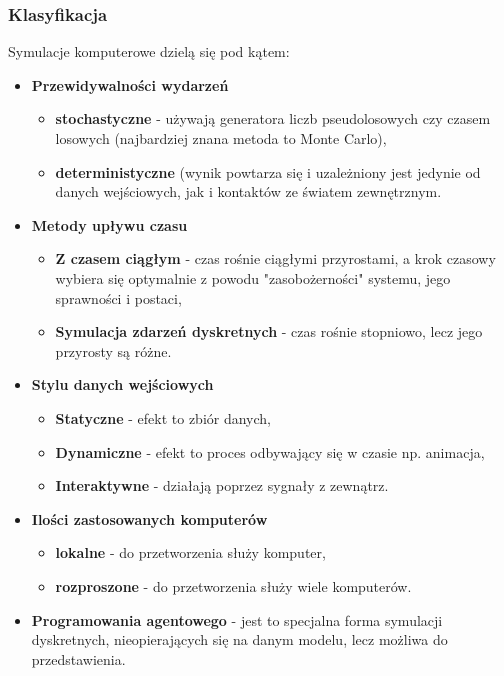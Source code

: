 \subsubsection{Klasyfikacja}

Symulacje komputerowe dzielą się pod kątem:

\begin{itemize}
	\item \textbf{Przewidywalności wydarzeń}
	\begin{itemize}
		\item \textbf{stochastyczne} - używają generatora liczb pseudolosowych czy czasem losowych (najbardziej znana metoda to Monte Carlo),
		\item \textbf{deterministyczne} (wynik powtarza się i uzależniony jest jedynie od danych wejściowych, jak i kontaktów ze światem zewnętrznym.
	\end{itemize}
	\item \textbf{Metody upływu czasu}
	\begin{itemize}
		\item \textbf{Z czasem ciągłym} - czas rośnie ciągłymi przyrostami, a krok czasowy wybiera się optymalnie z powodu "zasobożerności" systemu, jego sprawności i postaci,
		\item \textbf{Symulacja zdarzeń dyskretnych} - czas rośnie stopniowo, lecz jego przyrosty są różne.
	\end{itemize}
	\item \textbf{Stylu danych wejściowych}
	\begin{itemize}
		\item \textbf{Statyczne} - efekt to zbiór danych,
		\item \textbf{Dynamiczne} - efekt to proces odbywający się w czasie np. animacja,
		\item \textbf{Interaktywne} - działają poprzez sygnały z zewnątrz.
	\end{itemize}
	\item \textbf{Ilości zastosowanych komputerów}
	\begin{itemize}
		\item \textbf{lokalne} - do przetworzenia służy komputer,
		\item \textbf{rozproszone} - do przetworzenia służy wiele komputerów.
	\end{itemize}
	\item \textbf{Programowania agentowego} - jest to specjalna forma symulacji dyskretnych, nieopierających się na danym modelu, lecz możliwa do przedstawienia. \\
\end{itemize}

